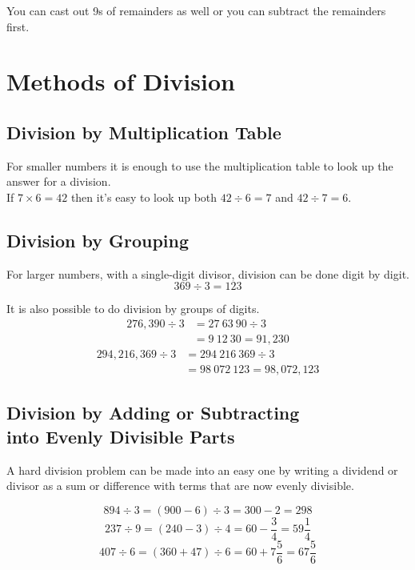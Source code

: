 \documentclass{article}
\begin{document}
You can cast out 9s of remainders as well or you can subtract the remainders first.\\


\section{Methods of Division}

\subsection{Division by Multiplication Table}

For smaller numbers it is enough to use the multiplication table to look up the answer for a division.\\

If $7 \times 6 = 42$ then it's easy to look up both $42 \div 6 = 7$ and $42 \div 7 = 6$.\\

\subsection{Division by Grouping}

For larger numbers, with a single-digit divisor, division can be done digit by digit.
$$369 \div 3 = 123$$

It is also possible to do division by groups of digits.
\begin{align*}
276,390 \div 3 & = 27\ 63\ 90 \div 3\\
               & = 9\ 12\ 30 = 91,230
\end{align*}
\begin{align*}
294,216,369 \div 3 & = 294\ 216\ 369 \div 3\\
                   & = 98\ 072\ 123 = 98,072,123
\end{align*}

\pagebreak

\subsection{Division by Adding or Subtracting\\into Evenly Divisible Parts}

A hard division problem can be made into an easy one by writing a dividend or divisor as a sum or difference with terms that are now evenly divisible.

$$894 \div 3 = (900 - 6) \div 3 = 300 - 2 = 298$$
$$237 \div 9 = (240 - 3) \div 4 = 60 - \frac{3}{4} = 59 \frac{1}{4}$$
$$407 \div 6 = (360 + 47) \div 6 = 60 + 7 \frac{5}{6} = 67 \frac{5}{6}$$\\
\end{document}
